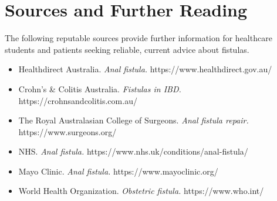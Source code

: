 \section*{Sources and Further Reading}
The following reputable sources provide further information for healthcare students and patients seeking reliable, current advice about fistulas.
\begin{itemize}
    \item Healthdirect Australia. \textit{Anal fistula.} https://www.healthdirect.gov.au/
    \item Crohn's \& Colitis Australia. \textit{Fistulas in IBD.} https://crohnsandcolitis.com.au/
    \item The Royal Australasian College of Surgeons. \textit{Anal fistula repair.} https://www.surgeons.org/
    \item NHS. \textit{Anal fistula.} https://www.nhs.uk/conditions/anal-fistula/
    \item Mayo Clinic. \textit{Anal fistula.} https://www.mayoclinic.org/
    \item World Health Organization. \textit{Obstetric fistula.} https://www.who.int/
\end{itemize}

